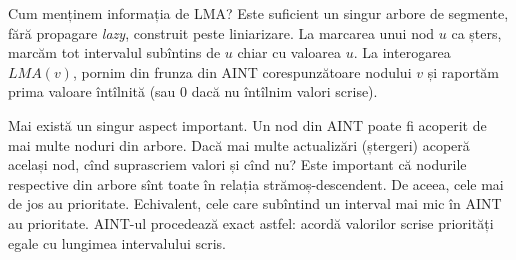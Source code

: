 \documentclass[../main.tex]{subfiles}
\begin{document}
Cum menținem informația de LMA? Este suficient un singur arbore de segmente, fără propagare \textit{lazy}, construit peste liniarizare. La marcarea unui nod $u$ ca șters, marcăm tot intervalul subîntins de $u$ chiar cu valoarea $u$. La interogarea $LMA(v)$, pornim din frunza din AINT corespunzătoare nodului $v$ și raportăm prima valoare întîlnită (sau 0 dacă nu întîlnim valori scrise).

Mai există un singur aspect important. Un nod din AINT poate fi acoperit de mai multe noduri din arbore. Dacă mai multe actualizări (ștergeri) acoperă același nod, cînd suprascriem valori și cînd nu? Este important că nodurile respective din arbore sînt toate în relația strămoș-descendent. De aceea, cele mai de jos au prioritate. Echivalent, cele care subîntind un interval mai mic în AINT au prioritate. AINT-ul procedează exact astfel: acordă valorilor scrise priorități egale cu lungimea intervalului scris.
\end{document}
